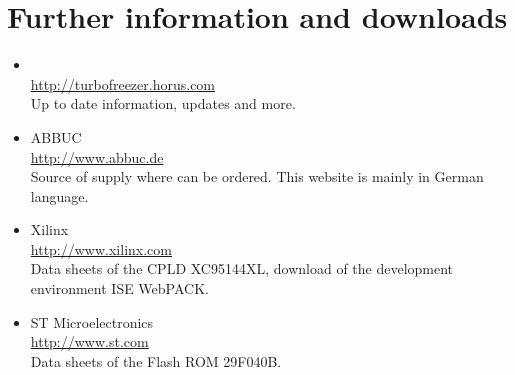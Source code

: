 \chapter{Further information and downloads}
\begin{itemize}

\item
\frz\\
\url{http://turbofreezer.horus.com}\\
Up to date information, updates and more.

\item
ABBUC\\
\url{http://www.abbuc.de}\\
Source of supply where \frz can be ordered. This website is mainly in German language.

\item
Xilinx\\
\url{http://www.xilinx.com}\\
Data sheets of the CPLD XC95144XL, download of the development environment ISE WebPACK.

\item
ST Microelectronics\\
\url{http://www.st.com}\\
Data sheets of the Flash ROM 29F040B.

\end{itemize}
